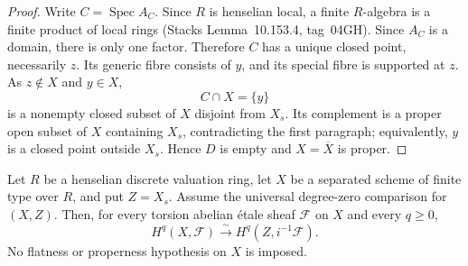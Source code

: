 \begin{proof}
Write $C=\operatorname{Spec}A_C$. Since $R$ is henselian local, a
finite $R$-algebra is a finite product of local rings
(Stacks Lemma~10.153.4, tag~04GH). Since $A_C$
is a domain, there is only one factor. Therefore $C$ has a unique
closed point, necessarily $z$. Its generic fibre consists of $y$,
and its special fibre is supported at $z$. As $z\notin X$ and $y\in X$,
\[
 C\cap X=\{y\}
\]
is a nonempty closed subset of $X$ disjoint from $X_s$. Its complement
is a proper open subset of $X$ containing $X_s$, contradicting the
first paragraph; equivalently, $y$ is a closed point outside $X_s$.
Hence $D$ is empty and $X=\overline X$ is proper.
\end{proof}

\begin{theorem}\label{C:henselian-trait-comparison}
Let $R$ be a henselian discrete valuation ring, let $X$ be a separated
scheme of finite type over $R$, and put $Z=X_s$. Assume the universal
degree-zero comparison for $(X,Z)$. Then, for every torsion abelian
\'etale sheaf $\mathcal F$ on $X$ and every $q\ge0$,
\[
 H^q(X,\mathcal F)\xrightarrow{\sim}H^q(Z,i^{-1}\mathcal F).
\]
No flatness or properness hypothesis on $X$ is imposed.
\end{theorem}
